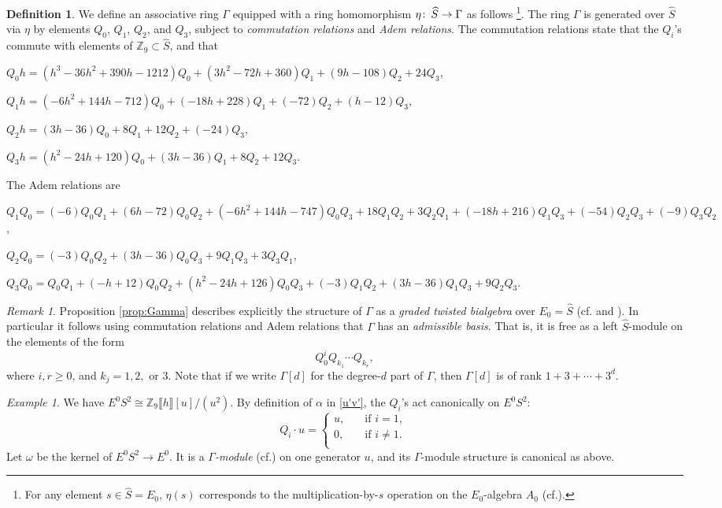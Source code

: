\documentclass{gtpart}
\theoremstyle{definition}
\newtheorem{defn}[thm]{Definition}
\theoremstyle{remark}
\newtheorem{rmk}[thm]{Remark}
\newtheorem{exam}[thm]{Example}
\def\co{\colon\thinspace}
\newcommand{\mb}[1]{\mathbb{#1}}
\newcommand{\cff}[2]{cf.\thinspace{\cite[#1]{#2}}}
\newcommand{\BZ}{{\mb Z}}
\newcommand{\HS}{\widehat{S}}
\newcommand{\A}{\alpha}
\newcommand{\G}{\Gamma}
\begin{document}
\begin{defn}
\label{def}
 We define an associative ring $\G$ equipped with a ring homomorphism $\eta \co \HS \to \G$ as follows 
 \footnote{For any element $s \in \HS = E_0$, $\eta(s)$ corresponds to the multiplication-by-$s$ operation on the $E_0$-algebra $A_0$ (\cff{Section 6}{cong}).  }.  
 The ring $\G$ is generated over $\HS$ via $\eta$ by elements $Q_0$, $Q_1$, $Q_2$, and $Q_3$, subject to {\em commutation relations} and {\em Adem relations}.  
 The commutation relations state that the $Q_i$'s commute with elements of $\BZ_9 \subset \HS$, and that 

 $Q_0 h = (h^3 - 36 h^2 + 390 h - 1212) Q_0 + (3 h^2 - 72 h + 360) Q_1 + (9 h - 108) Q_2 + 24 Q_3$, 

 $Q_1 h = (-6 h^2 + 144 h - 712) Q_0 + (-18 h + 228) Q_1 + (-72) Q_2 + (h - 12) Q_3$, 

 $Q_2 h = (3 h - 36) Q_0 + 8 Q_1 + 12 Q_2 + (-24) Q_3$, 

 $Q_3 h = (h^2 - 24 h + 120) Q_0 + (3 h - 36) Q_1 + 8 Q_2 + 12 Q_3$.  

 The Adem relations are 

 $Q_1Q_0 = (-6) Q_0Q_1 + (6 h - 72) Q_0Q_2 + (-6 h^2 + 144 h - 747) Q_0Q_3 + 18 Q_1Q_2 + 3 Q_2Q_1 + (-18 h + 216) Q_1Q_3 + (-54) Q_2Q_3 + (-9) Q_3Q_2$, 

 $Q_2Q_0 = (-3) Q_0Q_2 + (3 h - 36) Q_0Q_3 + 9 Q_1Q_3 + 3 Q_3Q_1$, 

 $Q_3Q_0 = Q_0Q_1 + (-h + 12) Q_0Q_2 + (h^2 - 24 h + 126) Q_0Q_3 + (-3) Q_1Q_2 + (3 h - 36) Q_1Q_3 + 9 Q_2Q_3$.  
\end{defn}

\begin{rmk}
\label{rmk:rank}
 Proposition \ref{prop:Gamma} describes explicitly the structure of $\G$ as a {\em graded twisted bialgebra} over $E_0 = \HS$ (\cff{Section 5}{cong} and \cite[2.1]{h2p2}).  
 In particular it follows using commutation relations and Adem relations that $\G$ has an {\em admissible basis}.  
 That is, it is free as a left $\HS$-module on the elements of the form 
 \[
  Q_0^i Q_{k_1} \cdots Q_{k_r}, 
 \]
 where $i, r \geq 0$, and $k_j = 1, 2,$ or 3.  
 Note that if we write $\G[d]$ for the degree-$d$ part of $\G$, then $\G[d]$ is of rank $1 + 3 + \cdots + 3^d$.  
\end{rmk}

\begin{exam}
\label{ex:omega}
 We have $E^0 S^2 \cong \BZ_9 \llbracket h \rrbracket [u] / (u^2)$.  
 By definition of $\A$ in \eqref{u'v'}, the $Q_i$'s act canonically on $E^0 S^2$: 
 \[
  Q_i \cdot u = \left\{
  \begin{array}{ll}
    u,  & \quad \text{if $i = 1$, }\\
    0,  & \quad \text{if $i \neq 1$.  }\\
  \end{array}
  \right.
 \]
 Let $\omega$ be the kernel of $E^0 S^2 \to E^0$.  It is a {\em $\G$-module} (\cff{2.2}{h2p2}) on one generator $u$, and its $\G$-module structure is canonical as above.  
\end{exam}
\end{document}
